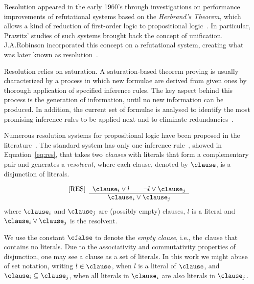 Resolution appeared in the early 1960's through investigations on performance
improvements of refutational systems based on the \emph{Herbrand's Theorem}, which
allows a kind of reduction of first-order logic to propositional
logic~\cite{casanova}. In particular, Prawitz' studies of such systems brought
back the concept of unification. J.\@ A.\@ Robinson incorporated this concept on a
refutational system, creating what was later known as
resolution~\cite{Robinson65}. 

Resolution relies on saturation. A saturation-based theorem proving is usually
characterized by a process in which new formulae are derived from given ones by
thorough application of specified inference rules. The key aspect behind this
process is the generation of information, until no new information can be
produced. In addition, the current set of formulae is analysed to identify the
most promising inference rules to be applied next and to eliminate
redundancies~\cite{bachmair2001resolution}.

Numerous resolution systems for propositional logic have been proposed in the
literature~\cite{bachmair2001resolution}. The standard system has only one
inference rule~\cite{Robinson65}, showed in Equation~\ref{eq:res}, that takes
two \emph{clauses} with literals that form a complementary pair and generates a
\emph{resolvent}, where each clause, denoted by $\clause$, is a disjunction of
literals. 

\begin{equation}
\label{eq:res}
 \begin{array}{lc}
     \mbox{[RES]} & \clause_i \lor l \qquad \neg l \lor \clause_j\\  \cline{2-2}
     & \clause_i \lor \clause_j
\end{array}
\end{equation}
where $\clause_i$ and $\clause_j$ are (possibly empty) clauses, $l$ is a literal
and $\clause_i \lor \clause_j$ is the resolvent.

We use the constant $\cfalse$ to denote the \emph{empty clause},
i.e., the clause that contains no literals. Due to the associativity and
commutativity properties of disjunction, one may see a clause as a set of
literals. In this work we might abuse of set notation, writing $l \in \clause$,
when $l$ is a literal of $\clause$, and $\clause_i \subseteq \clause_j$, when
all literals in $\clause_i$ are also literals in $\clause_j$.

